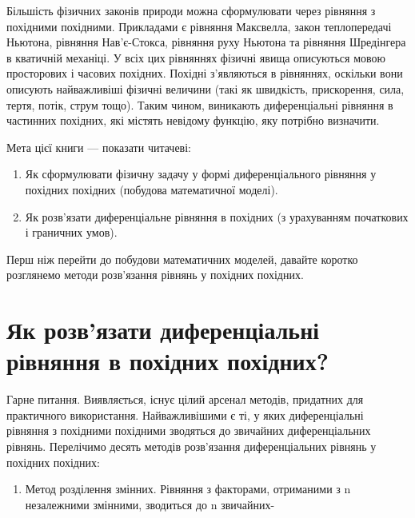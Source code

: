 \documentclass[
  ukrainian,
]{article}
\providecommand{\tightlist}{%
  \setlength{\itemsep}{0pt}\setlength{\parskip}{0pt}}
\begin{document}
Більшість фізичних законів природи можна сформулювати через рівняння з
похідними похідними. Прикладами є рівняння Максвелла, закон
теплопередачі Ньютона, рівняння Нав'є-Стокса, рівняння руху Ньютона та
рівняння Шредінгера в кватичній механіці. У всіх цих рівняннях фізичні
явища описуються мовою просторових і часових похідних. Похідні
з'являються в рівняннях, оскільки вони описують найважливіші фізичні
величини (такі як швидкість, прискорення, сила, тертя, потік, струм
тощо). Таким чином, виникають диференціальні рівняння в частинних
похідних, які містять невідому функцію, яку потрібно визначити.

Мета цієї книги --- показати читачеві:

\begin{enumerate}
\def\labelenumi{\arabic{enumi}.}
\item
  Як сформулювати фізичну задачу у формі диференціального рівняння у
  похідних похідних (побудова математичної моделі).
\item
  Як розв'язати диференціальне рівняння в похідних (з урахуванням
  початкових і граничних умов).
\end{enumerate}

Перш ніж перейти до побудови математичних моделей, давайте коротко
розглянемо методи розв'язання рівнянь у похідних похідних.

\section{Як розв'язати диференціальні рівняння в похідних
похідних?}\label{ux44fux43a-ux440ux43eux437ux432ux44fux437ux430ux442ux438-ux434ux438ux444ux435ux440ux435ux43dux446ux456ux430ux43bux44cux43dux456-ux440ux456ux432ux43dux44fux43dux43dux44f-ux432-ux43fux43eux445ux456ux434ux43dux438ux445-ux43fux43eux445ux456ux434ux43dux438ux445}

Гарне питання. Виявляється, існує цілий арсенал методів, придатних для
практичного використання. Найважливішими є ті, у яких диференціальні
рівняння з похідними похідними зводяться до звичайних диференціальних
рівнянь. Перелічимо десять методів розв'язання диференціальних рівнянь у
похідних похідних:

\begin{enumerate}
\def\labelenumi{\arabic{enumi}.}
\tightlist
\item
  Метод розділення змінних. Рівняння з факторами, отриманими з n
  незалежними змінними, зводиться до n звичайних-
\end{enumerate}
\end{document}
